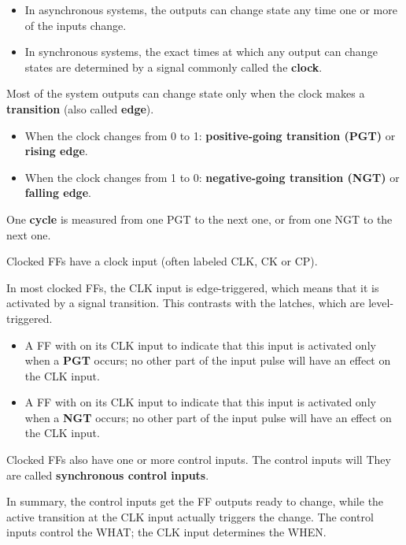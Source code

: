     \begin{itemize}
      \item In asynchronous systems, the outputs can change state any time one
        or more of the inputs change.
      \item In synchronous systems, the exact times at which any output can change
        states are determined by a signal commonly called the \textbf{clock}.
    \end{itemize}

    \par Most of the system outputs can change state only when the clock makes
    a \textbf{transition} (also called \textbf{edge}).
    \begin{itemize}
      \item When the clock changes from 0 to 1: \textbf{positive-going
        transition (PGT)} or \textbf{rising edge}.
      \item When the clock changes from 1 to 0: \textbf{negative-going
        transition (NGT)} or \textbf{falling edge}.
    \end{itemize}
    \par One \textbf{cycle} is measured from one PGT to the next one, or from
    one NGT to the next one.

    \par Clocked FFs have a clock input (often labeled CLK, CK or CP).
    \par In most clocked FFs, the CLK input is edge-triggered, which means
    that it is activated by a signal transition.
    This contrasts with the latches, which are level-triggered.
    \begin{itemize}
      \item A FF with  on its CLK input to indicate
        that this input is activated only when a \textbf{PGT} occurs;
        no other part of the input pulse will have an effect
        on the CLK input.
      \item A FF with  on its CLK input
      to indicate that this input is activated only when a \textbf{NGT}
      occurs; no other part of the input pulse will have an effect
      on the CLK input.
    \end{itemize}
    \par Clocked FFs also have one or more control inputs. The control
    inputs will  They are called \textbf{synchronous control inputs}.
    \par In summary, the control inputs get the FF outputs ready to change,
    while the active transition at the CLK input actually triggers
    the change. The control inputs control the WHAT; the CLK input determines the WHEN.

